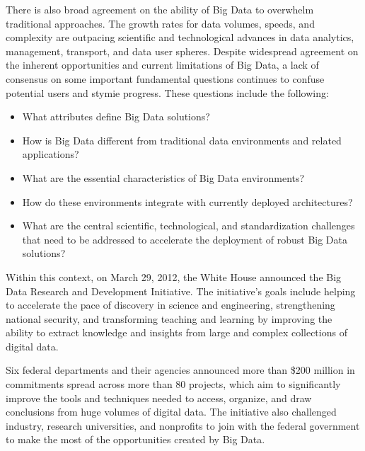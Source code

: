 \documentclass[11pt]{article}
\begin{document}
There is also broad agreement on the ability of Big Data to overwhelm traditional approaches. The growth 
rates for data volumes, speeds, and complexity are outpacing scientific and technological advances in data 
analytics, management, transport, and data user spheres. 
Despite widespread agreement on the inherent opportunities and current limitations of Big Data, a lack of 
consensus on some important fundamental questions continues to confuse potential users and stymie 
progress. These questions include the following: 

\begin{itemize}
\item	What attributes define Big Data solutions? 
\item	How is Big Data different from traditional data environments and related applications? 
\item	What are the essential characteristics of Big Data environments? 
\item	How do these environments integrate with currently deployed architectures? 
\item	What are the central scientific, technological, and
standardization challenges that need to be  addressed to accelerate the deployment of robust Big Data solutions?
\end{itemize}



Within this context, on March 29, 2012, the White House announced the Big Data Research and 
Development Initiative.  The initiative’s goals include helping to accelerate the pace of discovery in 
science and engineering, strengthening national security, and transforming teaching and learning by 
improving the ability to extract knowledge and insights from large and complex collections of digital 
data.

Six federal departments and their agencies announced more than \$200 million in commitments spread 
across more than 80 projects, which aim to significantly improve the tools and techniques needed to 
access, organize, and draw conclusions from huge volumes of digital data. The initiative also challenged 
industry, research universities, and nonprofits to join with the federal government to make the most of the 
opportunities created by Big Data. 
\end{document}
